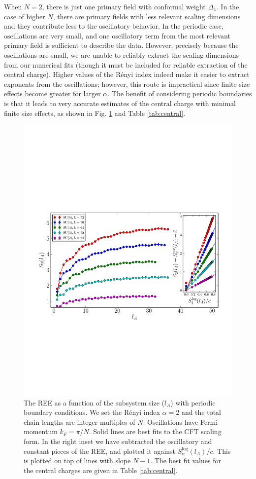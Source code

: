 \documentclass[aps,prb,reprint,floatfix]{revtex4-1}
\begin{document}
When $N=2$, there is just one primary field with conformal weight $\Delta_{1}$.  In the case of higher $N$, there are primary fields with less relevant scaling dimensions and they contribute less to the oscillatory behavior.  In the periodic case, oscillations are very small, and one oscillatory term from the most relevant primary field is sufficient to describe the data.  However, precisely because the oscillations are small, we are unable to reliably extract the scaling dimensions from our numerical fits (though it must be included for reliable extraction of the central charge).  Higher values of the R\'{e}nyi index indeed make it easier to extract exponents from the oscillations; however, this route is impractical since finite size effects become greater for larger $\alpha$.  The benefit of considering periodic boundaries is that it leads to very accurate estimates of the central charge with minimal finite size effects, as shown in Fig. \ref{fig:REE} and Table \ref{tab:central}.  
\begin{figure}
\centerline{\includegraphics[angle=0,width=1.0\columnwidth]{EE.pdf}}
\caption{The REE as a function of the subsystem size ($l_{A}$) with periodic boundary conditions.  We set the R\'{e}nyi index $\alpha = 2$ and the total chain lengths are integer multiples of $N$.  Oscillations have Fermi momentum $k_{F}=\pi / N$. Solid lines are best fits to the CFT scaling form.  In the right inset we have subtracted the oscillatory and constant pieces of the REE, and plotted it against $S_{\alpha}^{\mathrm{log}}(l_{A})/c$.  This is plotted on top of lines with slope $N-1$.  The best fit values for the central charges are given in Table \ref{tab:central}.}
\label{fig:REE}
\end{figure}
\end{document}
